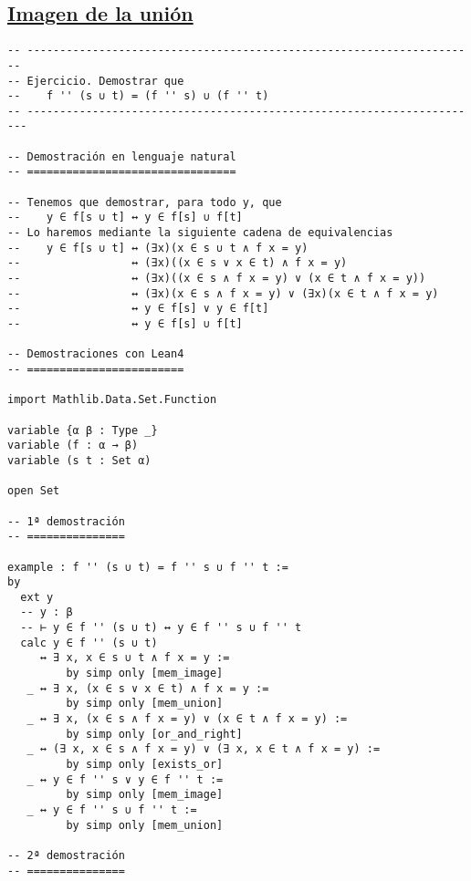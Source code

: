 \subsection{\href{./src/Conjuntos/Imagen\_de\_la\_union.lean}{Imagen de la unión}}
\label{sec:org81f04ab}
\begin{verbatim}
-- ---------------------------------------------------------------------
-- Ejercicio. Demostrar que
--    f '' (s ∪ t) = (f '' s) ∪ (f '' t)
-- ----------------------------------------------------------------------

-- Demostración en lenguaje natural
-- ================================

-- Tenemos que demostrar, para todo y, que
--    y ∈ f[s ∪ t] ↔ y ∈ f[s] ∪ f[t]
-- Lo haremos mediante la siguiente cadena de equivalencias
--    y ∈ f[s ∪ t] ↔ (∃x)(x ∈ s ∪ t ∧ f x = y)
--                 ↔ (∃x)((x ∈ s ∨ x ∈ t) ∧ f x = y)
--                 ↔ (∃x)((x ∈ s ∧ f x = y) ∨ (x ∈ t ∧ f x = y))
--                 ↔ (∃x)(x ∈ s ∧ f x = y) ∨ (∃x)(x ∈ t ∧ f x = y)
--                 ↔ y ∈ f[s] ∨ y ∈ f[t]
--                 ↔ y ∈ f[s] ∪ f[t]

-- Demostraciones con Lean4
-- ========================

import Mathlib.Data.Set.Function

variable {α β : Type _}
variable (f : α → β)
variable (s t : Set α)

open Set

-- 1ª demostración
-- ===============

example : f '' (s ∪ t) = f '' s ∪ f '' t :=
by
  ext y
  -- y : β
  -- ⊢ y ∈ f '' (s ∪ t) ↔ y ∈ f '' s ∪ f '' t
  calc y ∈ f '' (s ∪ t)
     ↔ ∃ x, x ∈ s ∪ t ∧ f x = y :=
         by simp only [mem_image]
   _ ↔ ∃ x, (x ∈ s ∨ x ∈ t) ∧ f x = y :=
         by simp only [mem_union]
   _ ↔ ∃ x, (x ∈ s ∧ f x = y) ∨ (x ∈ t ∧ f x = y) :=
         by simp only [or_and_right]
   _ ↔ (∃ x, x ∈ s ∧ f x = y) ∨ (∃ x, x ∈ t ∧ f x = y) :=
         by simp only [exists_or]
   _ ↔ y ∈ f '' s ∨ y ∈ f '' t :=
         by simp only [mem_image]
   _ ↔ y ∈ f '' s ∪ f '' t :=
         by simp only [mem_union]

-- 2ª demostración
-- ===============


\end{verbatim}

